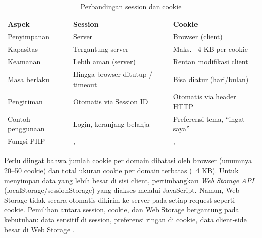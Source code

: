 \begin{table}[ht]
\centering
\begin{tabular}{|P{3cm}|P{5cm}|P{5cm}|}
\hline
\textbf{Aspek} & \textbf{Session} & \textbf{Cookie} \\
\hline
Penyimpanan & Server & Browser (client) \\
\hline
Kapasitas & Tergantung server & Maks. ~4 KB per cookie \\
\hline
Keamanan & Lebih aman (server) & Rentan modifikasi client \\
\hline
Masa berlaku & Hingga browser ditutup / timeout & Bisa diatur (hari/bulan) \\
\hline
Pengiriman & Otomatis via Session ID & Otomatis via header HTTP \\
\hline
Contoh penggunaan & Login, keranjang belanja & Preferensi tema, ``ingat saya'' \\
\hline
Fungsi PHP & ,  & ,  \\
\hline
\end{tabular}
\caption{Perbandingan session dan cookie}
\end{table}

Perlu diingat bahwa jumlah cookie per domain dibatasi oleh browser (umumnya 20--50 cookie) dan total ukuran cookie per domain terbatas (~4 KB). Untuk menyimpan data yang lebih besar di sisi client, pertimbangkan \textit{Web Storage API} (localStorage/sessionStorage) yang diakses melalui JavaScript. Namun, Web Storage tidak secara otomatis dikirim ke server pada setiap request seperti cookie. Pemilihan antara session, cookie, dan Web Storage bergantung pada kebutuhan: data sensitif di session, preferensi ringan di cookie, data client-side besar di Web Storage \cite{phpManual}.

